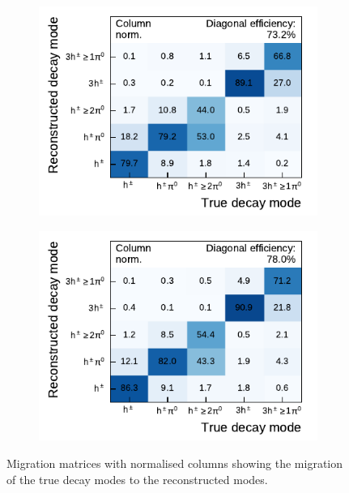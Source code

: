 \begin{figure}[htb]
  \begin{subfigure}[t]{0.48\textwidth}
    \centering
    \includegraphics{./figures/decay_mode_classification/mig_mat_pantau.pdf}
  \end{subfigure}\hfill
  \begin{subfigure}[t]{0.48\textwidth}
    \centering
    \includegraphics{./figures/decay_mode_classification/mig_mat_baseline_ptcut_1_5.pdf}
  \end{subfigure}
  \caption{Migration matrices with normalised columns showing the migration of
    the true decay modes to the reconstructed modes. }
  \label{fig:migmat}
\end{figure}


